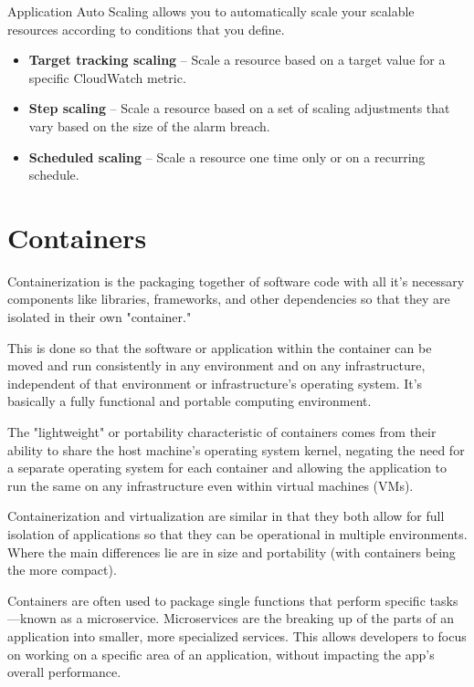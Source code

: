 		Application Auto Scaling allows you to automatically scale your scalable resources according to conditions that you define.
		\begin{itemize}
			\item \textbf{Target tracking scaling} – Scale a resource based on a target value for a specific CloudWatch metric.
			\item \textbf{Step scaling} – Scale a resource based on a set of scaling adjustments that vary based on the size of the alarm breach.
			\item \textbf{Scheduled scaling} – Scale a resource one time only or on a recurring schedule.
		\end{itemize}

\section{Containers}
	Containerization \cite{container} is the packaging together of software code with all it’s necessary 
	components like 
	libraries, frameworks, and other dependencies so that they are isolated in their own "container."
	
	This is done so that the software or application within the container can be moved and run consistently 
	in any environment and on any infrastructure, independent of that environment or infrastructure’s 
	operating system. It’s basically a fully functional 
	and portable computing environment.

	The "lightweight" or portability characteristic of containers comes from their ability to share 
	the host machine’s operating system kernel, negating the need for a separate operating system for 
	each container and allowing the application to run the same on any infrastructure 
	even within virtual machines (VMs).

	Containerization and virtualization are similar in that they both allow for full isolation of 
	applications so that they can be operational in multiple environments. Where the main differences 
	lie are in size and portability (with containers being the more compact). 

	Containers are often used to package single functions that perform specific tasks—known as a microservice. 
	Microservices are the breaking up of the parts of an application into smaller, more specialized services. 
	This allows developers to focus on working on a specific area of an application, without impacting 
	the app’s overall performance. 

